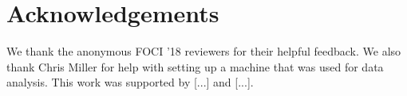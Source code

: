 
\section*{Acknowledgements}
We thank the anonymous FOCI '18 reviewers for their helpful
feedback. We also thank Chris Miller for help with setting up a 
machine that was used for data analysis. This work was supported by
[...] and [...].